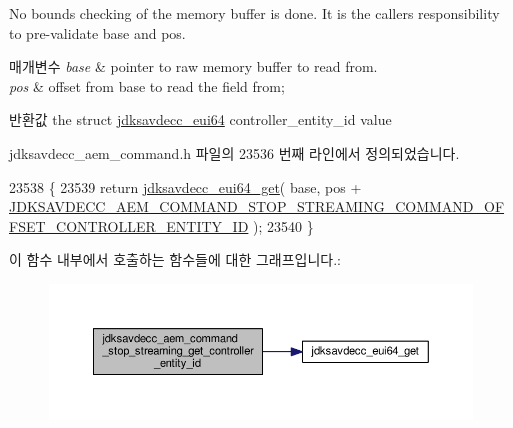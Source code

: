 No bounds checking of the memory buffer is done. It is the caller\textquotesingle{}s responsibility to pre-\/validate base and pos.


\begin{DoxyParams}{매개변수}
{\em base} & pointer to raw memory buffer to read from. \\
\hline
{\em pos} & offset from base to read the field from; \\
\hline
\end{DoxyParams}
\begin{DoxyReturn}{반환값}
the struct \hyperlink{structjdksavdecc__eui64}{jdksavdecc\+\_\+eui64} controller\+\_\+entity\+\_\+id value 
\end{DoxyReturn}


jdksavdecc\+\_\+aem\+\_\+command.\+h 파일의 23536 번째 라인에서 정의되었습니다.


\begin{DoxyCode}
23538 \{
23539     \textcolor{keywordflow}{return} \hyperlink{group__eui64_ga2652311a25a6b91cddbed75c108c7031}{jdksavdecc\_eui64\_get}( base, pos + 
      \hyperlink{group__command__stop__streaming_gae2df888c7bfea3738615f05f74bf32ae}{JDKSAVDECC\_AEM\_COMMAND\_STOP\_STREAMING\_COMMAND\_OFFSET\_CONTROLLER\_ENTITY\_ID}
       );
23540 \}
\end{DoxyCode}


이 함수 내부에서 호출하는 함수들에 대한 그래프입니다.\+:
\nopagebreak
\begin{figure}[H]
\begin{center}
\leavevmode
\includegraphics[width=350pt]{group__command__stop__streaming_ga9990321b93daff2f0f7c869ab00d55b1_cgraph}
\end{center}
\end{figure}


